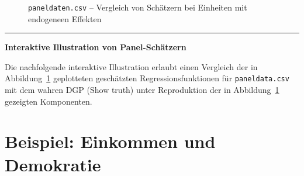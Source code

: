 \documentclass[
  a4paper,
  DIV=11,
  oneside]{scrreprt}
\begin{document}
\begin{figure}[t]


\caption{\label{fig-panelcomparison}\texttt{paneldaten.csv} -- Vergleich
von Schätzern bei Einheiten mit endogeneen Effekten}

\end{figure}%

\begin{center}\rule{0.5\linewidth}{0.5pt}\end{center}

\textbf{Interaktive Illustration von Panel-Schätzern}

Die nachfolgende interaktive Illustration erlaubt einen Vergleich der in
Abbildung~\ref{fig-panelcomparison} geplotteten geschätzten
Regressionsfunktionen für \texttt{paneldata.csv} mit dem wahren DGP
(Show truth) unter Reproduktion der in
Abbildung~\ref{fig-panelcomparison} gezeigten Komponenten.

\section{Beispiel: Einkommen und
Demokratie}\label{beispiel-einkommen-und-demokratie}
\end{document}
